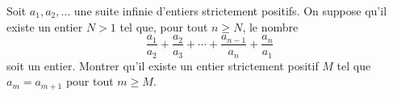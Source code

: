 Soit $a_1, a_2, \ldots$ une suite infinie d'entiers strictement positifs. On suppose qu'il existe un entier
$N > 1$ tel que, pour tout $n \geqslant N$, le nombre
\[
\frac{a_1}{a_2} + \frac{a_2}{a_3} + \cdots + \frac{a_{n-1}}{a_n} + \frac{a_n}{a_1}
\]
soit un entier. Montrer qu'il existe un entier strictement positif $M$ tel que $a_m = a_{m+1}$ pour tout
$m \geqslant M$.
